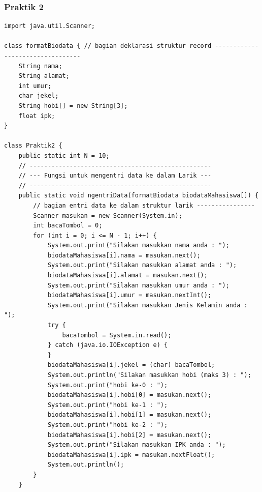 \documentclass[a4paper,12pt]{article}
\begin{document}
\subsubsection{Praktik 2}
\begin{lstlisting}
import java.util.Scanner;

class formatBiodata { // bagian deklarasi struktur record ---------------------------------
    String nama;
    String alamat;
    int umur;
    char jekel;
    String hobi[] = new String[3];
    float ipk;
}

class Praktik2 {
    public static int N = 10;
    // --------------------------------------------------
    // --- Fungsi untuk mengentri data ke dalam Larik ---
    // --------------------------------------------------
    public static void ngentriData(formatBiodata biodataMahasiswa[]) {
        // bagian entri data ke dalam struktur larik ----------------
        Scanner masukan = new Scanner(System.in);
        int bacaTombol = 0;
        for (int i = 0; i <= N - 1; i++) {
            System.out.print("Silakan masukkan nama anda : ");
            biodataMahasiswa[i].nama = masukan.next();
            System.out.print("Silakan masukkan alamat anda : ");
            biodataMahasiswa[i].alamat = masukan.next();
            System.out.print("Silakan masukkan umur anda : ");
            biodataMahasiswa[i].umur = masukan.nextInt();
            System.out.print("Silakan masukkan Jenis Kelamin anda : ");
            try {
                bacaTombol = System.in.read();
            } catch (java.io.IOException e) {
            }
            biodataMahasiswa[i].jekel = (char) bacaTombol;
            System.out.println("Silakan masukkan hobi (maks 3) : ");
            System.out.print("hobi ke-0 : ");
            biodataMahasiswa[i].hobi[0] = masukan.next();
            System.out.print("hobi ke-1 : ");
            biodataMahasiswa[i].hobi[1] = masukan.next();
            System.out.print("hobi ke-2 : ");
            biodataMahasiswa[i].hobi[2] = masukan.next();
            System.out.print("Silakan masukkan IPK anda : ");
            biodataMahasiswa[i].ipk = masukan.nextFloat();
            System.out.println();
        }
    }


\end{lstlisting}
\end{document}

